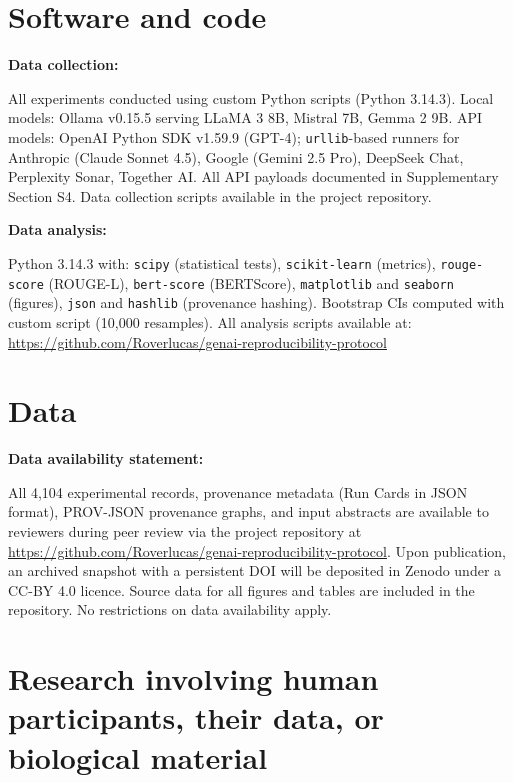 \documentclass[11pt]{article}
\begin{document}
\section*{Software and code}

\noindent\textbf{Data collection:}

All experiments conducted using custom Python scripts (Python 3.14.3). Local models: Ollama v0.15.5 serving LLaMA 3 8B, Mistral 7B, Gemma 2 9B. API models: OpenAI Python SDK v1.59.9 (GPT-4); \texttt{urllib}-based runners for Anthropic (Claude Sonnet 4.5), Google (Gemini 2.5 Pro), DeepSeek Chat, Perplexity Sonar, Together AI. All API payloads documented in Supplementary Section S4. Data collection scripts available in the project repository.

\medskip
\noindent\textbf{Data analysis:}

Python 3.14.3 with: \texttt{scipy} (statistical tests), \texttt{scikit-learn} (metrics), \texttt{rouge-score} (ROUGE-L), \texttt{bert-score} (BERTScore), \texttt{matplotlib} and \texttt{seaborn} (figures), \texttt{json} and \texttt{hashlib} (provenance hashing). Bootstrap CIs computed with custom script (10,000 resamples). All analysis scripts available at: \url{https://github.com/Roverlucas/genai-reproducibility-protocol}

\section*{Data}

\noindent\textbf{Data availability statement:}

All 4,104 experimental records, provenance metadata (Run Cards in JSON format), PROV-JSON provenance graphs, and input abstracts are available to reviewers during peer review via the project repository at \url{https://github.com/Roverlucas/genai-reproducibility-protocol}. Upon publication, an archived snapshot with a persistent DOI will be deposited in Zenodo under a CC-BY 4.0 licence. Source data for all figures and tables are included in the repository. No restrictions on data availability apply.

\section*{Research involving human participants, their data, or biological material}
\end{document}
